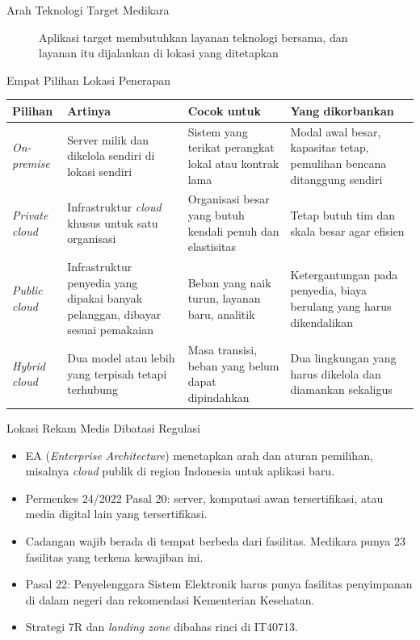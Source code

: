 \documentclass[aspectratio=169, table, 12pt]{beamer}
\begin{document}
\begin{frame}{{\Large Arah Teknologi Target Medikara}}
  \centering
  \begin{figure}
    \resizebox{0.86\textwidth}{!}{}
    \caption{Aplikasi target membutuhkan layanan teknologi bersama, dan layanan itu dijalankan di
             lokasi yang ditetapkan}
  \end{figure}
\end{frame}

\begin{frame}{{\Large Empat Pilihan Lokasi Penerapan}}
  \scriptsize
  \begin{tabularx}{\textwidth}{L{1.7cm}YYY}
    \hline
    \textbf{Pilihan} & \textbf{Artinya} & \textbf{Cocok untuk} & \textbf{Yang dikorbankan} \\
    \hline
    \textit{On-premise} & Server milik dan dikelola sendiri di lokasi sendiri &
      Sistem yang terikat perangkat lokal atau kontrak lama &
      Modal awal besar, kapasitas tetap, pemulihan bencana ditanggung sendiri \\
    \hline
    \textit{Private cloud} & Infrastruktur \textit{cloud} khusus untuk satu organisasi &
      Organisasi besar yang butuh kendali penuh dan elastisitas &
      Tetap butuh tim dan skala besar agar efisien \\
    \hline
    \textit{Public cloud} & Infrastruktur penyedia yang dipakai banyak pelanggan, dibayar sesuai pemakaian &
      Beban yang naik turun, layanan baru, analitik &
      Ketergantungan pada penyedia, biaya berulang yang harus dikendalikan \\
    \hline
    \textit{Hybrid cloud} & Dua model atau lebih yang terpisah tetapi terhubung &
      Masa transisi, beban yang belum dapat dipindahkan &
      Dua lingkungan yang harus dikelola dan diamankan sekaligus \\
    \hline
  \end{tabularx}
\end{frame}

\begin{frame}{{\Large Lokasi Rekam Medis Dibatasi Regulasi}}
  \small
  \vspace{6pt}
  \begin{itemize}
    \item EA (\textit{Enterprise Architecture}) menetapkan arah dan aturan pemilihan, misalnya
          \textit{cloud} publik di region Indonesia untuk aplikasi baru.
    \item Permenkes 24/2022 Pasal 20: server, komputasi awan tersertifikasi, atau media digital lain
          yang tersertifikasi.
    \item Cadangan wajib berada di tempat berbeda dari fasilitas. Medikara punya 23 fasilitas yang
          terkena kewajiban ini.
    \item Pasal 22: Penyelenggara Sistem Elektronik harus punya fasilitas penyimpanan di dalam negeri
          dan rekomendasi Kementerian Kesehatan.
    \item Strategi 7R dan \textit{landing zone} dibahas rinci di IT40713.
  \end{itemize}
\end{frame}
\end{document}
